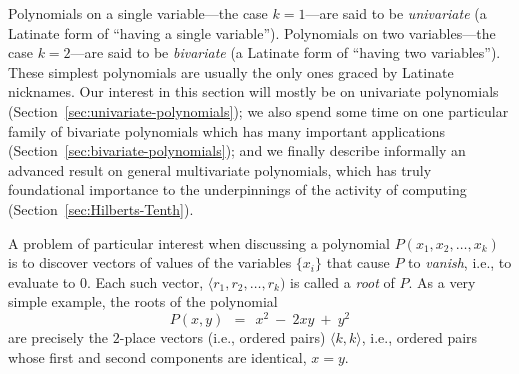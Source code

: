 \medskip

 

Polynomials on a single variable---the case $k=1$---are said to be {\it univariate} (a Latinate form of ``having a single variable'').  Polynomials on two variables---the case $k=2$---are said to be {\it bivariate} (a Latinate form of ``having two variables'').  These simplest polynomials are usually the only ones graced by Latinate nicknames.  Our interest in this section will mostly be on univariate polynomials (Section~\ref{sec:univariate-polynomials}); we also spend some time on one particular family of bivariate polynomials which has many important applications (Section~\ref{sec:bivariate-polynomials}); and we finally describe informally an advanced result on general multivariate polynomials, which has truly foundational importance to the underpinnings of the activity of computing (Section~\ref{sec:Hilberts-Tenth}).

\bigskip


A problem of particular interest when discussing a polynomial $P(x_1, x_2, \ldots, x_k)$ is to discover vectors of values of the variables $\{x_i\}$ that cause $P$ to {\em vanish}, i.e., to evaluate to $0$.  Each such vector, $\langle r_1, r_2, \ldots, r_k)$ is called a {\it root} of $P$.  As a very simple example, the roots of the polynomial
\[ P(x,y) \ \ = \ \ x^2 \ - \ 2xy \ + \ y^2 \]
are precisely the $2$-place vectors (i.e., ordered pairs) $\langle k,k \rangle$, i.e., ordered pairs whose first and second components are identical, $x=y$.

\medskip

